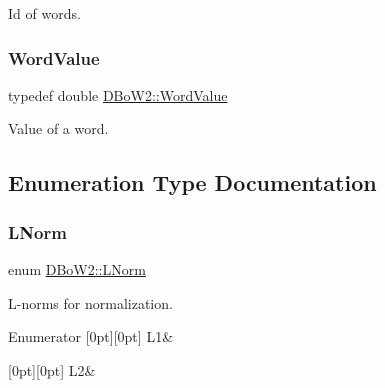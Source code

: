 Id of words. 

\mbox{\label{namespace_d_bo_w2_a55fcd7333e591a38e96b91f41bc182f6}} 
\subsubsection{\texorpdfstring{Word\+Value}{WordValue}}
{\footnotesize\ttfamily typedef double \mbox{\hyperlink{namespace_d_bo_w2_a55fcd7333e591a38e96b91f41bc182f6}{D\+Bo\+W2\+::\+Word\+Value}}}



Value of a word. 



\subsection{Enumeration Type Documentation}
\mbox{\label{namespace_d_bo_w2_a53e9e0bcfc25c861815e413a7cf3fa51}} 
\subsubsection{\texorpdfstring{L\+Norm}{LNorm}}
{\footnotesize\ttfamily enum \mbox{\hyperlink{namespace_d_bo_w2_a53e9e0bcfc25c861815e413a7cf3fa51}{D\+Bo\+W2\+::\+L\+Norm}}}



L-\/norms for normalization. 

\begin{DoxyEnumFields}{Enumerator}
[0pt][0pt]{}\mbox{\label{namespace_d_bo_w2_a53e9e0bcfc25c861815e413a7cf3fa51a94f5879ff083c0a8364805ae4f9c2d5c}} 
L1&\\
\hline

[0pt][0pt]{}\mbox{\label{namespace_d_bo_w2_a53e9e0bcfc25c861815e413a7cf3fa51aff96c9503798aa8504a954d3832e5eaa}} 
L2&\\
\hline

\end{DoxyEnumFields}
\mbox{\label{namespace_d_bo_w2_aa252a592dd607c6e60dede06ceef2722}} 

